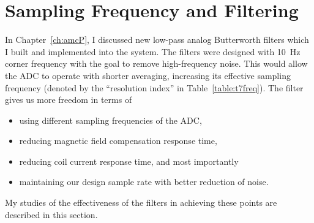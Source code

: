 

\section{Sampling Frequency and Filtering}\label{sec:freq}


In Chapter~\ref{ch:amcP}, I discussed new low-pass analog Butterworth
filters which I built and implemented into the system.  The filters
were designed with 10~Hz corner frequency with the goal to remove
high-frequency noise.  This would allow the ADC to operate with shorter
averaging, increasing its effective sampling frequency (denoted by the
``resolution index'' in Table~\ref{table:t7freq}).  The filter gives
us more freedom in terms of
\begin{itemize}
    \item using different sampling frequencies of the ADC,
    \item reducing magnetic field compensation response time,
    \item reducing coil current response time, and most importantly
    \item maintaining our design sample rate with better reduction of noise.
\end{itemize}
My studies of the effectiveness of the filters in achieving these
points are described in this section.




